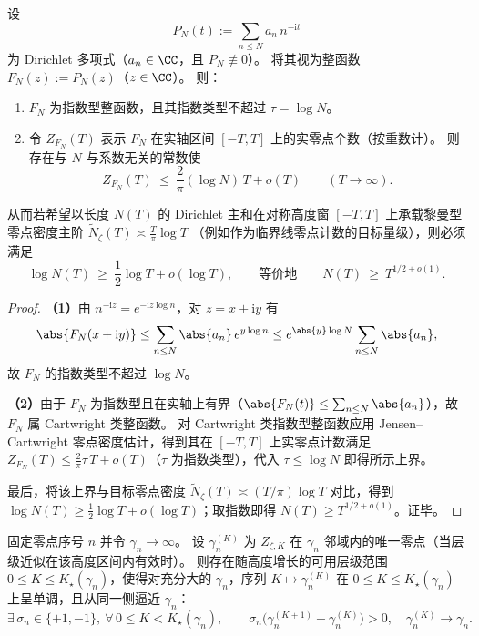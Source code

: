 \begin{theorem}\label{thm:cdim-rs-dirichlet-sqrtT-length-barrier}
设
\[
P_N(t):=\sum_{n\le N}a_n\,n^{-\mathrm{i}t}
\]
为 Dirichlet 多项式（\(a_n\in\CC\)，且 \(P_N\not\equiv 0\)）。
将其视为整函数 \(F_N(z):=P_N(z)\)（\(z\in\CC\)）。
则：
\begin{enumerate}
  \item \(F_N\) 为指数型整函数，且其指数类型不超过 \(\tau=\log N\)。
  \item 令 \(Z_{F_N}(T)\) 表示 \(F_N\) 在实轴区间 \([-T,T]\) 上的实零点个数（按重数计）。
  则存在与 \(N\) 与系数无关的常数使
  \[
  Z_{F_N}(T)\ \le\ \frac{2}{\pi}(\log N)\,T+o(T)\qquad(T\to\infty).
  \]
\end{enumerate}
从而若希望以长度 \(N(T)\) 的 Dirichlet 主和在对称高度窗 \([-T,T]\) 上承载黎曼型零点密度主阶
\(
\widetilde N_\zeta(T)\asymp \frac{T}{\pi}\log T
\)
（例如作为临界线零点计数的目标量级），则必须满足
\[
\log N(T)\ \ge\ \frac12\log T+o(\log T),
\qquad\text{等价地}\qquad
N(T)\ \ge\ T^{1/2+o(1)}.
\]
\end{theorem}

\begin{proof}
\textbf{（1）}由 \(n^{-\mathrm{i}z}=e^{-\mathrm{i}z\log n}\)，对 \(z=x+\mathrm{i}y\) 有
\[
\abs{F_N(x+\mathrm{i}y)}
\le \sum_{n\le N}\abs{a_n}\,e^{y\log n}
\le e^{\abs{y}\log N}\sum_{n\le N}\abs{a_n},
\]
故 \(F_N\) 的指数类型不超过 \(\log N\)。
\par
\textbf{（2）}由于 \(F_N\) 为指数型且在实轴上有界（\(\abs{F_N(t)}\le \sum_{n\le N}\abs{a_n}\)），故 \(F_N\) 属 Cartwright 类整函数。
对 Cartwright 类指数型整函数应用 Jensen--Cartwright 零点密度估计，得到其在 \([-T,T]\) 上实零点计数满足
\(
Z_{F_N}(T)\le \frac{2}{\pi}\tau\,T+o(T)
\)（\(\tau\) 为指数类型），代入 \(\tau\le \log N\) 即得所示上界。
\par
最后，将该上界与目标零点密度 \(\widetilde N_\zeta(T)\asymp (T/\pi)\log T\) 对比，得到 \(\log N(T)\ge \frac12\log T+o(\log T)\)；取指数即得 \(N(T)\ge T^{1/2+o(1)}\)。证毕。
\end{proof}

\begin{conjecture}[高位零点的单侧层级收敛]\label{conj:cdim-rs-gabcke-one-sided-convergence}
固定零点序号 \(n\) 并令 \(\gamma_n\to\infty\)。
设 \(\gamma_n^{(K)}\) 为 \(Z_{\zeta,K}\) 在 \(\gamma_n\) 邻域内的唯一零点（当层级近似在该高度区间内有效时）。
则存在随高度增长的可用层级范围 \(0\le K\le K_\star(\gamma_n)\)，使得对充分大的 \(\gamma_n\)，序列 \(K\mapsto \gamma_n^{(K)}\) 在 \(0\le K\le K_\star(\gamma_n)\) 上呈单调，且从同一侧逼近 \(\gamma_n\)：
\[
\exists\,\sigma_n\in\{+1,-1\},\ \forall\,0\le K<K_\star(\gamma_n),\qquad
\sigma_n\bigl(\gamma_n^{(K+1)}-\gamma_n^{(K)}\bigr)>0,
\quad
\gamma_n^{(K)}\to\gamma_n.
\]
\end{conjecture}

\endinput

